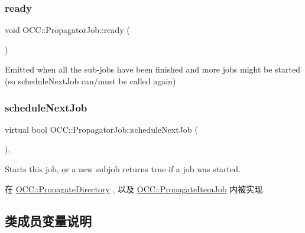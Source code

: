 \mbox{\label{class_o_c_c_1_1_propagator_job_a8e3be5aab321b6bfa4a82253f33ac1c6}} 
\subsubsection{\texorpdfstring{ready}{ready}}
{\footnotesize\ttfamily void O\+C\+C\+::\+Propagator\+Job\+::ready (\begin{DoxyParamCaption}{ }\end{DoxyParamCaption})\hspace{0.3cm}{\ttfamily [signal]}}

Emitted when all the sub-\/jobs have been finished and more jobs might be started (so schedule\+Next\+Job can/must be called again) \mbox{\label{class_o_c_c_1_1_propagator_job_a344574482155de72f164883b56f4ebf3}} 
\subsubsection{\texorpdfstring{schedule\+Next\+Job}{scheduleNextJob}}
{\footnotesize\ttfamily virtual bool O\+C\+C\+::\+Propagator\+Job\+::schedule\+Next\+Job (\begin{DoxyParamCaption}{ }\end{DoxyParamCaption})\hspace{0.3cm}{\ttfamily [pure virtual]}, {\ttfamily [slot]}}

Starts this job, or a new subjob returns true if a job was started. 

在 \hyperlink{class_o_c_c_1_1_propagate_directory_af5975e88fdfcbc25241a60c2fc2ef5ef}{O\+C\+C\+::\+Propagate\+Directory} , 以及 \hyperlink{class_o_c_c_1_1_propagate_item_job_adbc930944b34bb37f2a11d7b2bf3ab94}{O\+C\+C\+::\+Propagate\+Item\+Job} 内被实现.



\subsection{类成员变量说明}
\mbox{\label{class_o_c_c_1_1_propagator_job_adcbb5f2a95f6370a5af6378ca2b8b67c}} 

